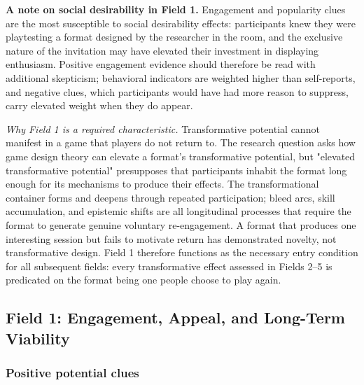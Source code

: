 \documentclass[12pt]{article}
\begin{document}
\bigskip

\noindent\textbf{A note on social desirability in Field 1.} Engagement and popularity clues are the most susceptible to social desirability effects: participants knew they were playtesting a format designed by the researcher in the room, and the exclusive nature of the invitation may have elevated their investment in displaying enthusiasm. Positive engagement evidence should therefore be read with additional skepticism; behavioral indicators are weighted higher than self-reports, and negative clues, which participants would have had more reason to suppress, carry elevated weight when they do appear.

\bigskip


\noindent\textit{Why Field 1 is a required characteristic.} Transformative potential cannot manifest in a game that players do not return to. The research question asks how game design theory can elevate a format's transformative potential, but "elevated transformative potential" presupposes that participants inhabit the format long enough for its mechanisms to produce their effects. The transformational container forms and deepens through repeated participation; bleed arcs, skill accumulation, and epistemic shifts are all longitudinal processes that require the format to generate genuine voluntary re-engagement. A format that produces one interesting session but fails to motivate return has demonstrated novelty, not transformative design. Field 1 therefore functions as the necessary entry condition for all subsequent fields: every transformative effect assessed in Fields 2--5 is predicated on the format being one people choose to play again.

\bigskip

\subsection*{Field 1: Engagement, Appeal, and Long-Term Viability}

\subsubsection*{Positive potential clues}
\end{document}
